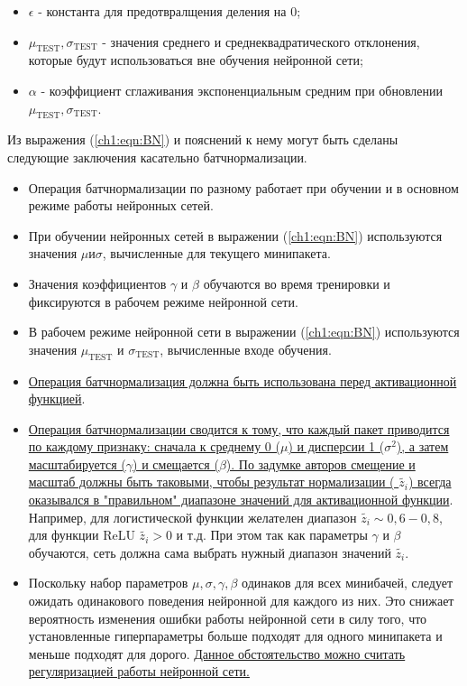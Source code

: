 \documentclass[12pt]{article}
\begin{document}
\begin{sloppypar}
\begin{itemize}
    \item $\epsilon$ - константа для предотвралщения деления на 0;
    \item $\mu_{\mathrm{TEST}},  \sigma_{\mathrm{TEST}}$ - значения среднего и среднеквадратического отклонения, которые будут использоваться вне обучения нейронной сети;
    \item $\alpha$ - коэффициент сглаживания экспоненциальным средним при обновлении $\mu_{\mathrm{TEST}},  \sigma_{\mathrm{TEST}}$.
\end{itemize}
Из выражения  (\ref{ch1:eqn:BN}) и пояснений к нему могут быть сделаны следующие заключения касательно батчнормализации.
\begin{itemize}
\itemsep 0.125em 
    \item Операция батчнормализации по разному работает при обучении и в основном режиме работы нейронных сетей. 
    \item При обучении нейронных сетей в выражении (\ref{ch1:eqn:BN}) используются значения $\mu и \sigma$, вычисленные для текущего минипакета. 
    \item Значения коэффициентов $\gamma$ и $\beta$ обучаются во время тренировки и фиксируются в рабочем режиме нейронной сети.
    \item В рабочем режиме нейронной сети в выражении (\ref{ch1:eqn:BN}) используются значения $\mu_{\mathrm{TEST}}$ и $\sigma_{\mathrm{TEST}}$, вычисленные входе обучения.
    \item \uline{Операция батчнормализация должна быть использована перед активационной функцией}.
    \item \uline{Операция батчнормализации сводится к тому, что каждый пакет приводится  по каждому признаку: сначала к среднему 0 ($\mu$) и дисперсии 1 ($\sigma^2$), а затем масштабируется ($\gamma$) и смещается ($\beta$). По задумке авторов смещение и масштаб должны быть таковыми, чтобы результат нормализации ( $\tilde{z_i}$) всегда оказывался в "правильном" диапазоне значений для активационной функции}. Например, для логистической функции желателен диапазон $\tilde{z_i}\sim 0,6-0,8$, для функции ReLU $\tilde{z_i}>0$ и т.д. При этом так как параметры $\gamma$ и $\beta$ обучаются, сеть должна сама выбрать нужный диапазон значений $\tilde{z_i}$.
    \item Поскольку набор параметров $\mu, \sigma, \gamma, \beta$ одинаков для всех минибачей, следует ожидать одинакового поведения нейронной для каждого из них. Это снижает вероятность изменения ошибки работы нейронной сети в силу того, что установленные гиперпараметры больше подходят для одного минипакета и меньше подходят для дорого. \uline{Данное обстоятельство можно считать регуляризацией работы нейронной сети.}

\end{itemize}
\end{sloppypar}
\end{document}
